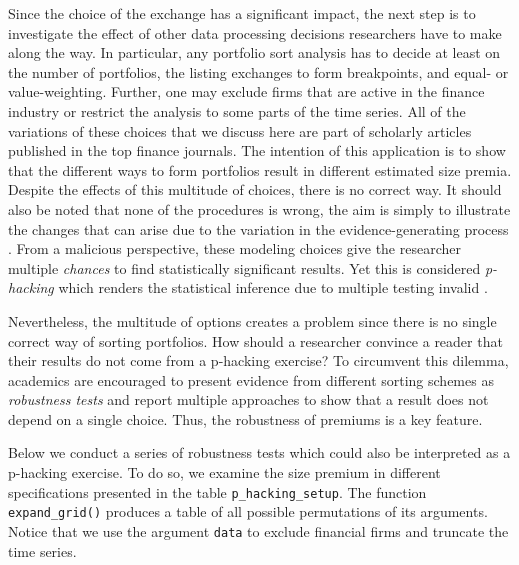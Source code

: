 \documentclass[
]{krantz}
\begin{document}
Since the choice of the exchange has a significant impact, the next step is to investigate the effect of other data processing decisions researchers have to make along the way. In particular, any portfolio sort analysis has to decide at least on the number of portfolios, the listing exchanges to form breakpoints, and equal- or value-weighting. Further, one may exclude firms that are active in the finance industry or restrict the analysis to some parts of the time series. All of the variations of these choices that we discuss here are part of scholarly articles published in the top finance journals.
The intention of this application is to show that the different ways to form portfolios result in different estimated size premia. Despite the effects of this multitude of choices, there is no correct way. It should also be noted that none of the procedures is wrong, the aim is simply to illustrate the changes that can arise due to the variation in the evidence-generating process \citep{Menkveld2022}.
From a malicious perspective, these modeling choices give the researcher multiple \emph{chances} to find statistically significant results. Yet this is considered \emph{p-hacking} which renders the statistical inference due to multiple testing invalid \citep{Harvey2016}.

Nevertheless, the multitude of options creates a problem since there is no single correct way of sorting portfolios. How should a researcher convince a reader that their results do not come from a p-hacking exercise? To circumvent this dilemma, academics are encouraged to present evidence from different sorting schemes as \emph{robustness tests} and report multiple approaches to show that a result does not depend on a single choice. Thus, the robustness of premiums is a key feature.

Below we conduct a series of robustness tests which could also be interpreted as a p-hacking exercise. To do so, we examine the size premium in different specifications presented in the table \texttt{p\_hacking\_setup}. The function \texttt{expand\_grid()} produces a table of all possible permutations of its arguments. Notice that we use the argument \texttt{data} to exclude financial firms and truncate the time series.
\end{document}
